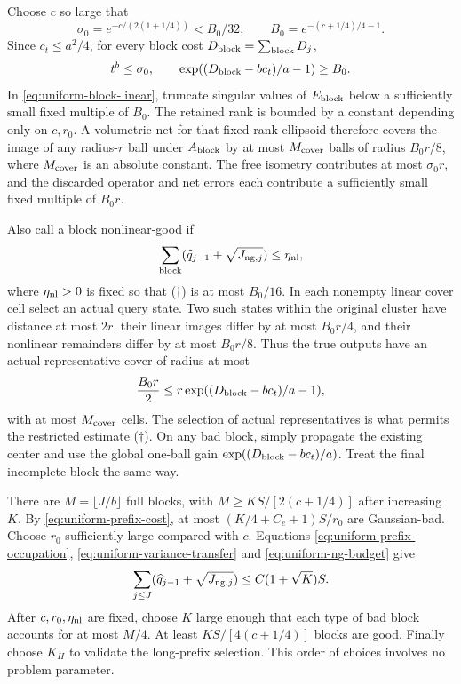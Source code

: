 \documentclass[11pt]{article}
\theoremstyle{remark}
\begin{document}
Choose $c$ so large that
\[
 \sigma_0=e^{-c/(2(1+1/4))}
   < B_0/32,\qquad B_0=e^{-(c+1/4)/4-1}.
\]
Since $c_t\le a^2/4$, for every block cost
$D_{\rm block}=\sum_{\rm block}D_j$,
\[
 t^b\le\sigma_0,\qquad
 \exp((D_{\rm block}-bc_t)/a-1)\ge B_0.
\]
In \eqref{eq:uniform-block-linear}, truncate singular values
of $E_{\rm block}$ below a sufficiently small fixed multiple
of $B_0$. The retained rank is bounded by a constant depending
only on $c,r_0$. A volumetric net for that fixed-rank ellipsoid
therefore covers the image of any radius-$r$ ball under
$A_{\rm block}$ by at most $M_{\rm cover}$ balls of radius
$B_0r/8$, where $M_{\rm cover}$ is an absolute constant.
The free isometry contributes at most $\sigma_0r$,
and the discarded operator and net errors each contribute
a sufficiently small fixed multiple of $B_0r$.

Also call a block nonlinear-good if
\[
 \sum_{\rm block}
 (\widehat q_{j-1}+\sqrt{J_{{\rm ng},j}})\le\eta_{\rm nl},
\]
where $\eta_{\rm nl}>0$ is fixed so that
(\(\dagger\)) is at most $B_0/16$. In each nonempty linear
cover cell select an actual query state. Two such states
within the original cluster have distance at most $2r$,
their linear images differ by at most $B_0r/4$, and their
nonlinear remainders differ by at most $B_0r/8$.
Thus the true outputs have an actual-representative cover of
radius at most
\begin{equation}
 \frac{B_0r}{2}
 \le r\exp((D_{\rm block}-bc_t)/a-1),
 \label{eq:uniform-good-block}
\end{equation}
with at most $M_{\rm cover}$ cells. The selection of actual
representatives is what permits the restricted estimate
(\(\dagger\)). On any bad block, simply propagate the
existing center and use the global one-ball gain
$\exp((D_{\rm block}-bc_t)/a)$.
Treat the final incomplete block the same way.

There are $M=\lfloor J/b\rfloor$ full blocks, with
$M\ge KS/[2(c+1/4)]$ after increasing $K$.
By \eqref{eq:uniform-prefix-cost}, at most
$(K/4+C_e+1)S/r_0$ are Gaussian-bad.
Choose $r_0$ sufficiently large compared with $c$.
Equations \eqref{eq:uniform-prefix-occupation},
\eqref{eq:uniform-variance-transfer} and
\eqref{eq:uniform-ng-budget} give
\[
 \sum_{j\le J}
 (\widehat q_{j-1}+\sqrt{J_{{\rm ng},j}})
 \le C(1+\sqrt K)S.
\]
After $c,r_0,\eta_{\rm nl}$ are fixed, choose $K$ large
enough that each type of bad block accounts for at most
$M/4$. At least $KS/[4(c+1/4)]$ blocks are good.
Finally choose $K_H$ to validate the long-prefix selection.
This order of choices involves no problem parameter.
\end{document}
